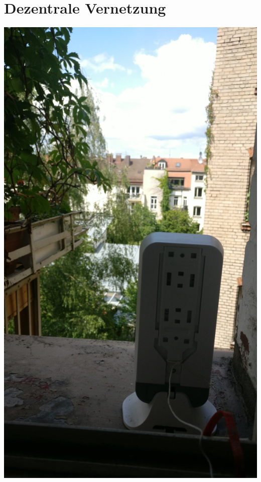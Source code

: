 \documentclass{beamer}
\begin{document}
	\section{Dezentrale Vernetzung}
	\begin{frame}
		\includegraphics[height=0.75\framewidth]{media/p2p-fensterbrett1.jpg}
	\end{frame}
\end{document}
